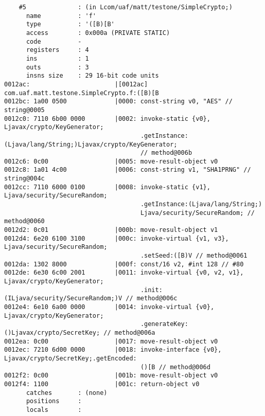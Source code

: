 \begin{lstlisting}
    #5              : (in Lcom/uaf/matt/testone/SimpleCrypto;)
      name          : 'f'
      type          : '([B)[B'
      access        : 0x000a (PRIVATE STATIC)
      code          -
      registers     : 4
      ins           : 1
      outs          : 3
      insns size    : 29 16-bit code units
0012ac:                       |[0012ac] com.uaf.matt.testone.SimpleCrypto.f:([B)[B
0012bc: 1a00 0500             |0000: const-string v0, "AES" // string@0005
0012c0: 7110 6b00 0000        |0002: invoke-static {v0}, Ljavax/crypto/KeyGenerator;
                                     .getInstance:(Ljava/lang/String;)Ljavax/crypto/KeyGenerator;
                                     // method@006b
0012c6: 0c00                  |0005: move-result-object v0
0012c8: 1a01 4c00             |0006: const-string v1, "SHA1PRNG" // string@004c
0012cc: 7110 6000 0100        |0008: invoke-static {v1}, Ljava/security/SecureRandom;
                                     .getInstance:(Ljava/lang/String;)
                                     Ljava/security/SecureRandom; // method@0060
0012d2: 0c01                  |000b: move-result-object v1
0012d4: 6e20 6100 3100        |000c: invoke-virtual {v1, v3}, Ljava/security/SecureRandom;
                                     .setSeed:([B)V // method@0061
0012da: 1302 8000             |000f: const/16 v2, #int 128 // #80
0012de: 6e30 6c00 2001        |0011: invoke-virtual {v0, v2, v1}, Ljavax/crypto/KeyGenerator;
                                     .init:(ILjava/security/SecureRandom;)V // method@006c
0012e4: 6e10 6a00 0000        |0014: invoke-virtual {v0}, Ljavax/crypto/KeyGenerator;
                                     .generateKey:()Ljavax/crypto/SecretKey; // method@006a
0012ea: 0c00                  |0017: move-result-object v0
0012ec: 7210 6d00 0000        |0018: invoke-interface {v0}, Ljavax/crypto/SecretKey;.getEncoded:
                                     ()[B // method@006d
0012f2: 0c00                  |001b: move-result-object v0
0012f4: 1100                  |001c: return-object v0
      catches       : (none)
      positions     :
      locals        :


\end{lstlisting}
